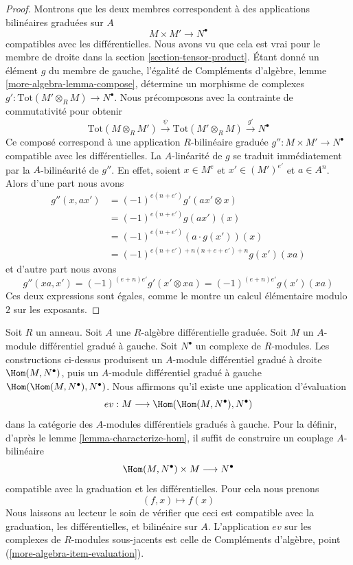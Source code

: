 \begin{proof}
Montrons que les deux membres correspondent à des applications bilinéaires graduées sur $A$
$$
M \times M' \longrightarrow N^\bullet
$$
compatibles avec les différentielles. Nous avons vu que cela est vrai pour le
membre de droite dans la section \ref{section-tensor-product}. Étant donné un
élément $g$ du membre de gauche, l'égalité de
Compléments d'algèbre, lemme \ref{more-algebra-lemma-compose},
détermine un morphisme de complexes
$g' : \text{Tot}(M' \otimes_R M) \to N^\bullet$. Nous
précomposons avec la contrainte de commutativité pour obtenir
$$
\text{Tot}(M \otimes_R M') \xrightarrow{\psi}
\text{Tot}(M' \otimes_R M) \xrightarrow{g'}
N^\bullet
$$
Ce composé correspond à une application
$R$-bilinéaire graduée $g'' : M \times M' \to N^\bullet$ compatible avec les
différentielles. La $A$-linéarité de $g$ se traduit immédiatement par la $A$-bilinéarité de
$g''$. En effet, soient $x \in M^e$ et $x' \in (M')^{e'}$ et $a \in A^n$.
Alors d'une part nous avons
\begin{align*}
g''(x, ax')
& =
(-1)^{e(n + e')} g'(ax' \otimes x) \\ &
=
(-1)^{e(n + e')} g(ax')(x) \\ &
=
(-1)^{e(n + e')} (a \cdot g(x'))(x) \\ & =
(-1)^{e(n
+ e') + n(n + e + e') + n} g(x')(xa)
\end{align*}
et d'autre part nous avons
$$
g''(xa, x') = (-1)^{(e + n)e'} g'(x' \otimes xa) =
(-1)^{(e + n)e'} g(x')(xa)
$$
Ces deux expressions sont égales, comme le montre un calcul élémentaire modulo $2$ sur les exposants.
\end{proof}

\begin{remark}
\label{remark-evaluation-map-left}
Soit $R$ un anneau. Soit $A$ une $R$-algèbre différentielle graduée.
Soit $M$ un $A$-module différentiel gradué à gauche. Soit
$N^\bullet$ un complexe de $R$-modules. Les constructions ci-dessus produisent
un $A$-module différentiel gradué à droite $\Hom(M, N^\bullet)$, puis un
$A$-module différentiel gradué à gauche $\Hom(\Hom(M,
N^\bullet), N^\bullet)$. Nous affirmons qu'il existe une application
d'évaluation
$$
ev : M \longrightarrow \Hom(\Hom(M, N^\bullet), N^\bullet)
$$
dans la catégorie des $A$-modules différentiels gradués à gauche. Pour la définir,
d'après le lemme \ref{lemma-characterize-hom}, il suffit de construire un
couplage $A$-bilinéaire
$$
\Hom(M, N^\bullet) \times M \longrightarrow N^\bullet
$$
compatible avec la graduation et les différentielles. Pour cela nous prenons
$$
(f, x) \longmapsto f(x)
$$
Nous laissons au lecteur le soin de vérifier que ceci est compatible avec la graduation,
les différentielles, et bilinéaire sur $A$. L'application $ev$ sur les complexes de
$R$-modules sous-jacents est celle de Compléments d'algèbre, point (\ref{more-algebra-item-evaluation}).
\end{remark}

